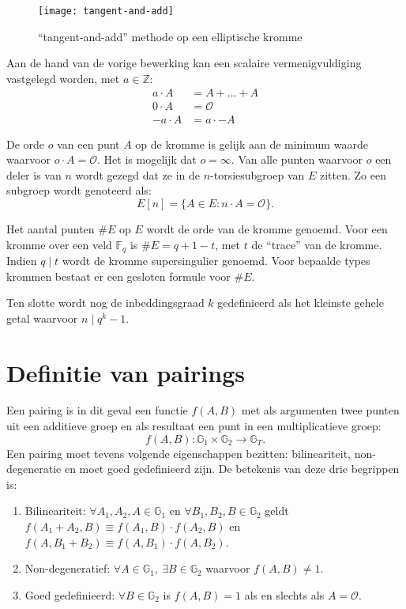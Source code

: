 \begin{figure}[h]
	\centering
		\texttt{[image: tangent-and-add]}
		\caption{``tangent-and-add'' methode op een elliptische kromme\label{figuur-pairings-tangent-and-chord}}
\end{figure}

Aan de hand van de vorige bewerking kan een scalaire vermenigvuldiging vastgelegd worden, met $a \in \mathbb{Z}$:
\[\begin{aligned}
a \cdot A	&= A + \ldots + A\\
0 \cdot A	&= \mathcal{O}\\
-a \cdot A	&= a \cdot -A
\end{aligned}\]

De orde $o$ van een punt $A$ op de kromme is gelijk aan de minimum waarde waarvoor $o \cdot A = \mathcal{O}$. Het is mogelijk dat $o = \infty$. Van alle punten waarvoor $o$ een deler is van $n$ wordt gezegd dat ze in de $n$-torsiesubgroep van $E$ zitten. Zo een subgroep wordt genoteerd als:
\[E[n] = \{ A \in E : n \cdot A = \mathcal{O} \}.\]

Het aantal punten $\#E$ op $E$ wordt de orde van de kromme genoemd. Voor een kromme over een veld $\mathbb{F}_q$ is $\#E = q + 1 - t$, met $t$ de ``trace'' van de kromme. Indien $q \mid t$ wordt de kromme supersingulier genoemd. Voor bepaalde types krommen bestaat er een gesloten formule voor $\#E$.

Ten slotte wordt nog de inbeddingsgraad $k$ gedefinieerd als het kleinste gehele getal waarvoor $n \mid q^k - 1$.

\section{Definitie van pairings}

Een pairing is in dit geval een functie $f(A, B)$ met als argumenten twee punten uit een additieve groep en als resultaat een punt in een multiplicatieve groep:
\[f(A, B): \mathbb{G}_1 \times \mathbb{G}_2 \rightarrow \mathbb{G}_T.\]
Een pairing moet tevens volgende eigenschappen bezitten: bilineariteit, non-degeneratie en moet goed gedefinieerd zijn. De betekenis van deze drie begrippen is:

\begin{enumerate}
	\item Bilineariteit: $\forall A_1, A_2, A \in \mathbb{G}_1$ en $\forall B_1, B_2, B \in \mathbb{G}_2$ geldt $f(A_1 + A_2, B) \equiv f(A_1, B) \cdot f(A_2, B)$ en $f(A, B_1 + B_2) \equiv f(A, B_1) \cdot f(A, B_2)$.

	\item Non-degeneratief: $\forall A \in \mathbb{G}_1, \: \exists B \in \mathbb{G}_2$ waarvoor $f(A, B) \neq 1$.

	\item Goed gedefinieerd: $\forall B \in \mathbb{G}_2$ is $f(A, B) = 1$ als en slechts als $A = \mathcal{O}$.
\end{enumerate}

